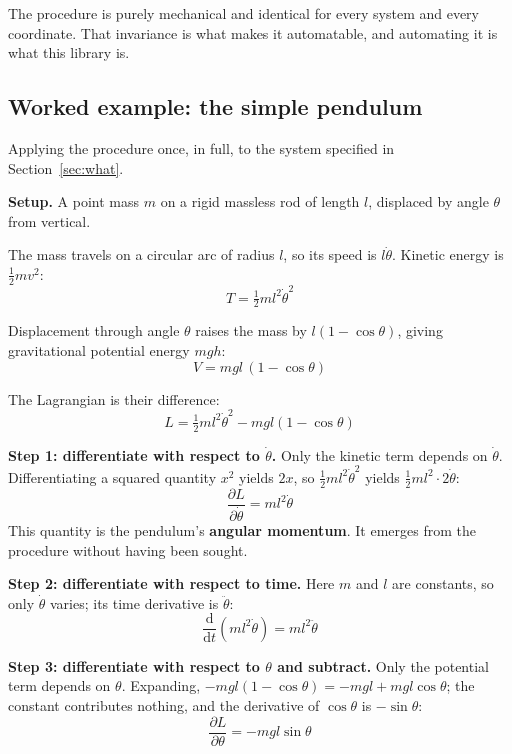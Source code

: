 \documentclass[11pt,a4paper]{article}
\newcommand{\ud}{\mathrm{d}}
\newcommand{\dd}[2]{\frac{\partial #1}{\partial #2}}
\newcommand{\ddt}[1]{\frac{\ud #1}{\ud t}}
\begin{document}
\noindent The procedure is purely mechanical and identical for every system and every coordinate.
That invariance is what makes it automatable, and automating it is what this library is.

\subsection{Worked example: the simple pendulum}
\label{sec:worked}

Applying the procedure once, in full, to the system specified in Section~\ref{sec:what}.

\medskip
\noindent\textbf{Setup.} A point mass $m$ on a rigid massless rod of length $l$, displaced by angle
$\theta$ from vertical.

The mass travels on a circular arc of radius $l$, so its speed is $l\dot\theta$. Kinetic energy is
$\tfrac{1}{2}mv^2$:
\begin{equation}
T = \tfrac{1}{2}m l^2\dot\theta^2
\end{equation}

Displacement through angle $\theta$ raises the mass by $l(1 - \cos\theta)$, giving gravitational
potential energy $mgh$:
\begin{equation}
V = mgl\,(1 - \cos\theta)
\end{equation}

The Lagrangian is their difference:
\begin{equation}
L = \tfrac{1}{2}m l^2\dot\theta^2 - mgl(1 - \cos\theta)
\end{equation}

\medskip
\noindent\textbf{Step 1: differentiate with respect to $\dot\theta$.}
Only the kinetic term depends on $\dot\theta$. Differentiating a squared quantity $x^2$ yields $2x$,
so $\tfrac{1}{2}ml^2\dot\theta^2$ yields $\tfrac{1}{2}ml^2 \cdot 2\dot\theta$:
\begin{equation}
\dd{L}{\dot\theta} = m l^2 \dot\theta
\end{equation}
This quantity is the pendulum's \textbf{angular momentum}. It emerges from the procedure without
having been sought.

\medskip
\noindent\textbf{Step 2: differentiate with respect to time.}
Here $m$ and $l$ are constants, so only $\dot\theta$ varies; its time derivative is $\ddot\theta$:
\begin{equation}
\ddt{}\left(m l^2 \dot\theta\right) = m l^2 \ddot\theta
\end{equation}

\medskip
\noindent\textbf{Step 3: differentiate with respect to $\theta$ and subtract.}
Only the potential term depends on $\theta$. Expanding,
$-mgl(1 - \cos\theta) = -mgl + mgl\cos\theta$; the constant contributes nothing, and the derivative
of $\cos\theta$ is $-\sin\theta$:
\begin{equation}
\dd{L}{\theta} = -mgl\sin\theta
\end{equation}
\end{document}
